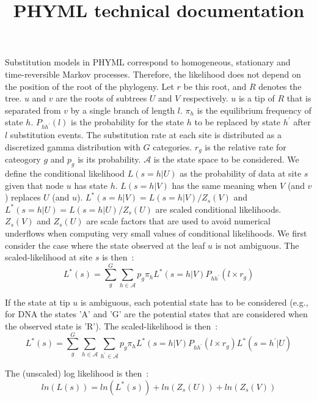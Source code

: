 \documentclass[a4paper,11pt]{article}
\begin{document}
\title{PHYML technical documentation}
\maketitle
Substitution models in PHYML correspond to homogeneous, stationary and
time-reversible Markov  processes. Therefore, the  likelihood does not
depend on the position of the root  of the phylogeny. Let $r$ be this root,
and $R$ denotes  the tree.  $u$ and  $v$ are the roots of subtrees $U$
and $V$ respectively.  $u$ is a tip of $R$ that  is separated from $v$
by a single branch of length $l$. $\pi_h$ is the equilibrium frequency
of state  $h$.  $P_{hh^{\prime}}(l)$ is the probability  for the state
$h$  to  be replaced  by  state  $h^{\prime}$  after $l$  substitution
events.   The substitution  rate  at  each site  is  distributed as  a
discretized  gamma distribution  with  $G$ categories.  $r_g$ is  the
relative    rate    for   cateogory    $g$    and    $p_g$   is    its
probability. $\mathcal{A}$  is the state  space to be  considered.  We
define  the conditional  likelihood $L(s=h|U)$  as the  probability of
data at site $s$ given that node $u$ has state $h$. $L(s=h|V)$ has the
same meaning when  $V$ (and $v$) replaces $U$ (and  $u$). $L^{*}(s=h|V) =
L(s=h|V) / Z_s(V)$ and $L^{*}(s=h|U) = L(s=h|U) / Z_s(U)$ are scaled
conditional likelihoods. $Z_s(V)$ and $Z_s(U)$ are  scale factors that
are used to avoid numerical underflows when computing very small values of
conditional likelihoods. We first consider
the case where the state observed at the leaf $u$ is not ambiguous. The
scaled-likelihood at site $s$ is then~:
\begin{equation}
L^{*}(s) = 
\sum_{g}^{G}\sum_{h \in \mathcal{A}}
p_{g}
\pi_h
L^{*}(s=h|V)
P_{hh^{\prime}}(l \times r_g)
\end{equation}

If the state at tip $u$ is ambiguous, each potential state has to be considered 
(e.g., for DNA the states 'A' and 'G' are the potential states that are 
considered when the observed state is 'R'). The scaled-likelihood is then~: 
\begin{equation}
L^{*}(s) =
\sum_{g}^{G}\sum_{h \in \mathcal{A}}\sum_{h^{\prime} \in \mathcal{A}}
p_{g}
\pi_h
L^{*}(s=h|V)
P_{hh^{\prime}}(l \times r_g)
L^{*}(s=h^{\prime}|U)
\end{equation}

The (unscaled) log likelihood is then~: 
\begin{equation}
ln(L(s)) = ln(L^{*}(s)) + ln(Z_s(U)) + ln (Z_s(V))
\end{equation}
\end{document}
